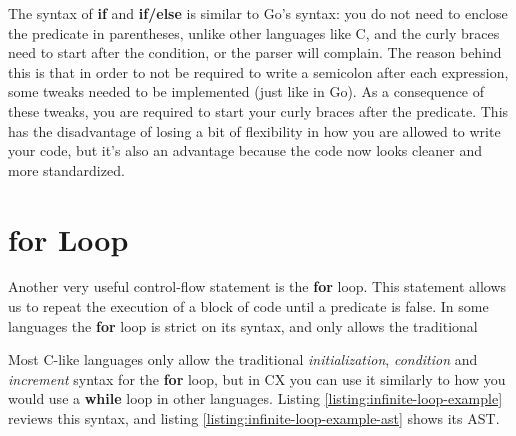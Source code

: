 \documentclass[11pt,fleqn,openany]{book} %
\begin{document}
The syntax of \textbf{if} and \textbf{if/else} is similar to Go's syntax: you do not need to enclose the predicate in parentheses, unlike other languages like C, and the curly braces need to start after the condition, or the parser will complain. The reason behind this is that in order to not be required to write a semicolon after each expression, some tweaks needed to be implemented (just like in Go). As a consequence of these tweaks, you are required to start your curly braces after the predicate. This has the disadvantage of losing a bit of flexibility in how you are allowed to write your code, but it's also an advantage because the code now looks cleaner and more standardized.

\section{for Loop}


Another very useful control-flow statement is the \textbf{for} loop. This statement allows us to repeat the execution of a block of code until a predicate is false. In some languages the \textbf{for} loop is strict on its syntax, and only allows the traditional

Most C-like languages only allow the traditional \emph{initialization}, \emph{condition} and \emph{increment} syntax for the \textbf{for} loop, but in CX you can use it similarly to how you would use a \textbf{while} loop in other languages. Listing \ref{listing:infinite-loop-example} reviews this syntax, and listing \ref{listing:infinite-loop-example-ast} shows its AST.
\end{document}
